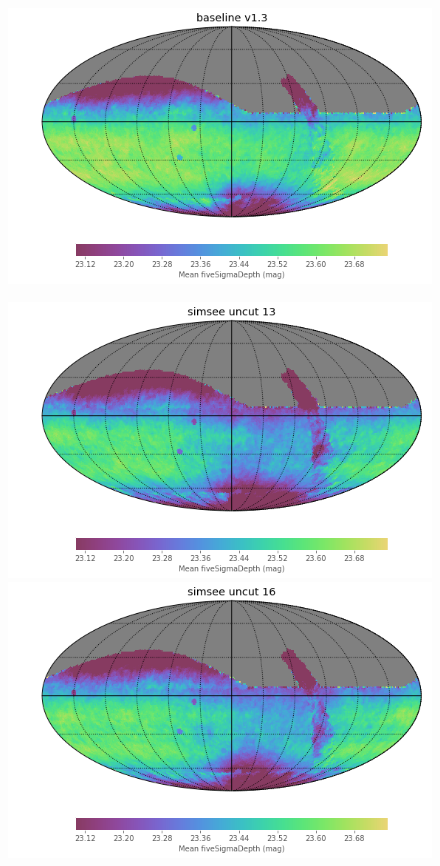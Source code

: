 \documentclass[DM,authoryear,toc]{lsstdoc}
\begin{document}
\begin{figure}
\begin{center}
  \includegraphics[width=\columnwidth]{./figures/depth_map_baseline_v1_3_10yrs.png}
\endminipage\hfill
\end{center}
  \includegraphics[width=\columnwidth]{./figures/depth_map_ss58777y13_v1_3_10yrs.png}
\endminipage\hfill
{}
  \includegraphics[width=\columnwidth]{./figures/depth_map_ss58777y16_v1_3_10yrs.png}

\end{figure}
\end{document}
